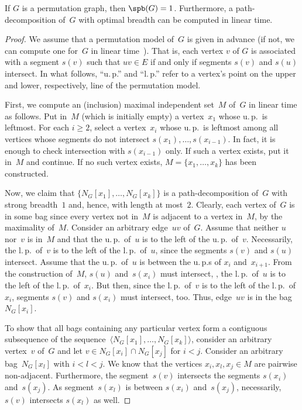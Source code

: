 \begin{theorem}
    \label{theo:pbPermutGr}
If \( G \) is a permutation graph, then \( \spb(G) = 1 \).
Furthermore, a path-decomposition of~\( G \) with optimal breadth can be computed in linear time.
\end{theorem}

\begin{proof}
We assume that a permutation model of~$G$ is given in advance (if not, we can compute one for~$G$ in linear time~\cite{McConnSpinra1997}).
That is, each vertex $v$ of $G$ is associated with a segment $s(v)$ such that $uv \in E$ if and only if segments $s(v)$ and $s(u)$ intersect.
In what follows, ``u.\,p.'' and ``l.\,p.'' refer to a vertex's point on the upper and lower, respectively, line of the permutation model.

First, we compute an (inclusion) maximal independent set~$M$ of~$G$ in linear time as follows.
Put in~$M$ (which is initially empty) a vertex~$x_1$ whose u.\,p.\ is leftmost.
For each $i \geq 2$, select a vertex~$x_i$ whose u.\,p.\ is leftmost among all vertices whose segments do not intersect $s(x_1), \ldots, s(x_{i - 1})$.
In fact, it is enough to check intersection with $s(x_{i - 1})$ only.
If such a vertex exists, put it in~$M$ and continue.
If no such vertex exists, $M = \{ x_1, \ldots, x_k \}$ has been constructed.

Now, we claim that $\big \{ N_G[x_1], \ldots, N_G[x_k] \big \}$ is a path-decomposition of~$G$ with strong breadth~$1$ and, hence, with length at most~$2$.
Clearly, each vertex of~$G$ is in some bag since every vertex not in~$M$ is adjacent to a vertex in~$M$, by the maximality of~$M$.
Consider an arbitrary edge~$uv$ of~$G$.
Assume that neither $u$ nor~$v$ is in~$M$ and that the u.\,p.\ of~$u$ is to the left of the u.\,p.\ of~$v$.
Necessarily, the l.\,p.\ of~$v$ is to the left of the l.\,p.\ of~$u$, since the segments $s(v)$ and $s(u)$ intersect.
Assume that the u.\,p.\ of~$u$ is between the u.\,p.s of $x_i$ and~$x_{i + 1}$.
From the construction of~$M$, $s(u)$ and~$s(x_i)$ must intersect, \ie, the l.\,p.\ of~$u$ is to the left of the l.\,p.\ of~$x_i$.
But then, since the l.\,p.\ of~$v$ is to the left of the l.\,p.\ of~$x_i$, segments $s(v)$ and $s(x_i)$ must intersect, too.
Thus, edge~$uv$ is in the bag~$N_G[x_i]$.

To show that all bags containing any particular vertex form a contiguous subsequence of the sequence~$\big \langle N_G[x_1], \ldots, N_G[x_k] \big \rangle$, consider an arbitrary vertex~$v$ of~$G$ and let $v \in N_G[x_i] \cap N_G[x_j]$ for $i < j$.
Consider an arbitrary bag~$N_G[x_l]$ with $i < l < j$.
We know that the vertices $x_i, x_l, x_j \in M$ are pairwise non-adjacent.
Furthermore, the segment~$s(v)$ intersects the segments $s(x_i)$ and~$s(x_j)$.
As segment~$s(x_l)$ is between $s(x_i)$ and~$s(x_j)$, necessarily, $s(v)$ intersects $s(x_l)$ as well.
\end{proof}

